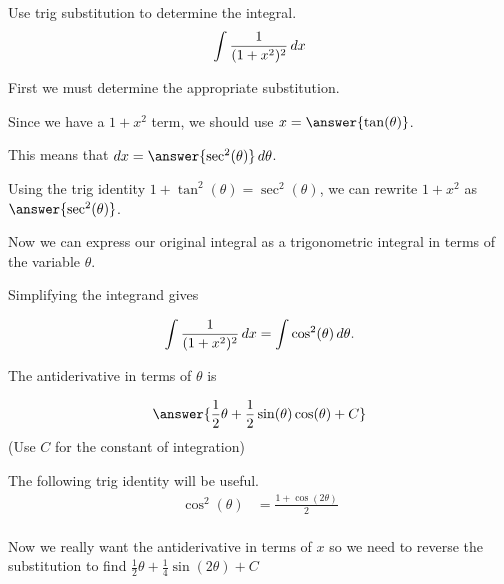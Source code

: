 \documentclass{ximera}
\author{Jason Miller}
\begin{document}
\begin{exercise}
Use trig substitution to determine the integral.
\[
\int \frac{1}{(1+x^2)^2} \mathop{}\!d x
\]

First we must determine the appropriate substitution. 

Since we have a $1+x^2$ term, we should use $x=\answer{\tan(\theta)}$. 

This means that $\d x= \answer{ \sec^{2}(\theta)} \d \theta$. 

\begin{exercise}
Using the trig identity $1+\tan^2(\theta)=\sec^{2}(\theta)$, we can rewrite $1+x^2$ as $\answer{\sec^{2}(\theta)}$. 

Now we can express our original integral as a trigonometric integral in terms of the variable $\theta$. 

\begin{image}
  \end{image}

Simplifying the integrand gives

\[
\int \frac{1}{(1+x^2)^2} \mathop{}\!d x  = \int \cos^2(\theta) \mathop{}\!d \theta.
\]

The antiderivative in terms of $\theta$ is 

\[
\answer{ \frac{1}{2}\theta + \frac{1}{2}\sin(\theta)\cos(\theta) + C}
\]
(Use $C$ for the constant of integration)

\begin{hint}
The following trig identity will be useful.
\begin{align}
\cos^{2}(\theta)&=\frac{1+\cos(2\theta)}{2} \\
\end{align}
\end{hint}

Now we really want the antiderivative in terms of $x$ so we need to reverse the substitution to find $\frac{1}{2}\theta + \frac{1}{4} \sin(2 \theta) + C$


\end{exercise}
\end{exercise}
\end{document}
